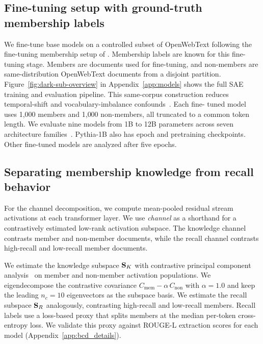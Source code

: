 \subsection{Fine-tuning setup with ground-truth membership labels}
\label{sec:methods:setup}

We fine-tune base models on a controlled subset of OpenWebText following the fine-tuning membership setup of \citet{meeus2025sok}. Membership labels are
known for this fine-tuning stage. Members are documents used for fine-tuning, and non-members are same-distribution OpenWebText documents from a disjoint
partition. Figure~\ref{fig:dark-sub-overview} in Appendix~\ref{app:models} shows the full SAE training and evaluation pipeline. This same-corpus construction reduces temporal-shift and vocabulary-imbalance confounds~\citep{duan2024membership,meeus2025sok}. Each fine-
tuned model uses 1{,}000 members and 1{,}000 non-members, all truncated to a common token length. We evaluate nine models from 1B to 12B parameters across
seven architecture
families~\citep{biderman2023pythia,black2021gpt,zhang2022opt,penedo2023refinedweb,jiang2023mistral,grattafiori2024llama3,yang2024qwen2}. Pythia-1B also
has epoch and pretraining checkpoints. Other fine-tuned models are analyzed after five epochs.

\subsection{Separating membership knowledge from recall behavior}
\label{sec:methods:bcd}

For the channel decomposition, we compute mean-pooled residual stream activations at each transformer layer. We use \emph{channel} as a shorthand for a
contrastively estimated low-rank activation subspace. The knowledge channel contrasts member and non-member documents, while the recall channel contrasts
high-recall and low-recall member documents.

We estimate the knowledge subspace $\mathbf{S}_K$ with contrastive principal component analysis~\citep{abid2018exploring} on member and non-member activation
populations. We eigendecompose the contrastive covariance $C_{\text{mem}} - \alpha\, C_{\text{non}}$ with $\alpha = 1.0$ and keep the leading $n_c = 10$
eigenvectors as the subspace basis. We estimate the recall subspace $\mathbf{S}_R$ analogously, contrasting high-recall and low-recall members. Recall labels use a
loss-based proxy that splits members at the median per-token cross-entropy loss. We validate this proxy against ROUGE-L extraction scores for each model
(Appendix~\ref{app:bcd_details}).

